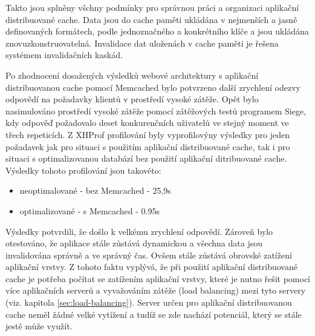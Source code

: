 \documentclass[12pt]{article}
\begin{document}
Takto jsou splněny všchny podmínky pro správnou práci a organizaci aplikační distribuované cache. Data jsou do cache paměti ukládána v nejmenších a jasně definovaných formátech, podle jednoznačného a konkrétního klíče a jsou ukládána znovuzkonstruovatelná. Invalidace dat uloženách v cache paměti je řešena systémem invalidačních kaskád.

Po zhodnocení dosažených výsledků webové architektury s aplikační distribuovanou cache pomocí Memcached bylo potvrzeno další zrychlení odezvy odpovědí na požadavky klientů v prostředí vysoké zátěže. Opět bylo nasimulováno prostředí vysoké zátěže pomocí zátěžových testů programem Siege, kdy odpověď požadovalo deset konkurenčních uživatelů ve stejný moment ve třech repeticích. Z XHProf profilování byly vyprofilovýny výsledky pro jeden požadavek jak pro situaci s použitím aplikační distribuované cache, tak i pro situaci s optimalizovanou databází bez použití aplikační ditribuované cache. Výsledky tohoto profilování jsou takovéto:

\begin{itemize}
\item neoptimalované - bez Memcached - 25,9s
\item optimalizované - s Memcached - 0.95s
\end{itemize}

Výsledky potvrdili, že došlo k velkému zrychlení odpovědí. Zároveň bylo otestováno, že aplikace stále zůstává dynamickou a všechna data jsou invalidována správně a ve správný čas. Ovšem stále zůstává obrovské zatížení aplikační vrstvy. Z tohoto faktu vyplývá, že při použití aplikační distribuované cache je potřeba počítat se zatížením aplikační vrstvy, které je nutno řešit pomocí více aplikačních serverů a vyvažováním zátěže (load balancing) mezi tyto servery (viz. kapitola \ref{sec:load-balancing}). Server určen pro aplikační distribuovanou cache neměl žádné velké vytížení a tudíž se zde nachází potenciál, který se stále jestě může využít.

\obrazek
{}

\clearpage

\obrazek
{}
\end{document}
